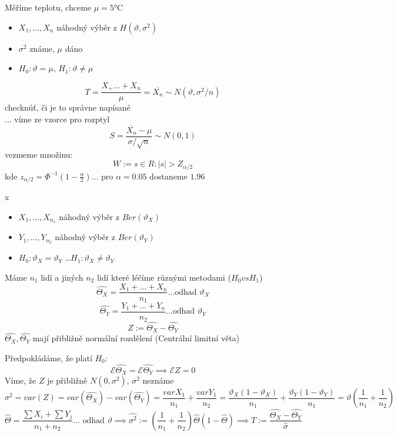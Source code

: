 \documentclass[../main.tex]{subfiles}
\begin{document}
\begin{example}
    Měříme teplotu, chceme $\mu = 5$°C
    \begin{itemize}
        \item $X_1,\dots,X_n$ náhodný výběr z $H(\vartheta,\sigma^2)$
        \item $\sigma^2$ známe, $\mu$ dáno
        \item $H_0 : \vartheta = \mu$, $H_1: \vartheta \neq \mu$
    \end{itemize}
    \[T = \frac{X_+\dots+X_n}{\mu} = \overline{X_n} \sim N(\vartheta, \sigma^2/n)\]
    checknúť, či je to správne napísané \^\\
    ... víme ze vzorce pro rozptyl
    \[S = \frac{\overline{X_n} - \mu}{\sigma/\sqrt{n}} \sim N(0,1)\]
    vezmeme množinu:
    \[W := {s\in R : |s| > Z_{\alpha/2}}\]
    kde $z_{\alpha/2} = \Phi^{-1}(1-\frac{\alpha}{2})$... pro $\alpha = 0.05$ dostaneme $1.96$
\end{example}

\begin{example}
    {\color{white} x}
    \begin{itemize}
        \item $X_1,\dots,X_{n_1}$ náhodný výběr z $Ber(\vartheta_X)$
        \item $Y_1,\dots,Y_{n_2}$ náhodný výběr z $Ber(\vartheta_Y)$
        \item $H_0 : \vartheta_X = \vartheta_Y$ \dots $H_1 : \vartheta_X \neq \vartheta_Y$
    \end{itemize}
    Máme $n_1$ lidí a jiných $n_2$ lidí které léčíme různými metodami ($H_0 vs H_1$)
    \[\widehat{\Theta_X} = \frac{X_1 +\dots + X_n}{n_1} \dots \text{odhad }\vartheta_X\]
    \[\widehat{\Theta_Y} = \frac{Y_1 +\dots + Y_n}{n_2} \dots \text{odhad }\vartheta_Y\]
    \[Z := \widehat{\Theta_X} - \widehat{\Theta_Y}\]
    $\widehat{\Theta_X}, \widehat{\Theta_Y}$ mají přibližně normální rozdělení (Centrální limitní věta)

    Předpokládáme, že platí $H_0$:
    \[\mathcal{E}\widehat{\Theta_X} = \mathcal{E}\widehat{\Theta_Y} \implies \mathcal{E}Z = 0\]
    Víme, že $Z$ je přibližně $N(0,\sigma^2)$, $\sigma^2$ neznáme
    \[\sigma^2 = var(Z) = var(\widehat{\Theta_X}) - var(\widehat{\Theta_Y}) = \frac{var X_1}{n_1} + \frac{var Y_1}{n_2} = \frac{\vartheta_X(1-\vartheta_X)}{n_1} + \frac{\vartheta_Y(1-\vartheta_Y)}{n_1} = \vartheta(\frac{1}{n_1} + \frac{1}{n_2})\]
    \[\widehat{\Theta} = \frac{\sum X_i + \sum Y_j}{n_1 + n_2} \dots \text{ odhad }\vartheta \implies \widehat{\sigma^2} := (\frac{1}{n_1} + \frac{1}{n_2}) \widehat{\Theta} (1- \widehat{\Theta}) \implies T:= \frac{\widehat{\Theta_X} - \widehat{\Theta_Y}}{\widehat{\sigma}}\]
\end{example}
\end{document}
